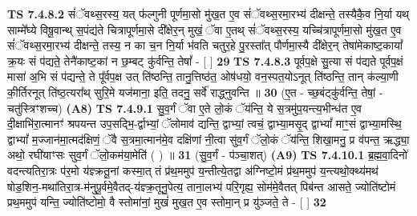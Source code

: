 \documentclass[17pt]{extarticle}
\begin{document}
                  \newline
                                \textbf{ TS 7.4.8.2} \newline
                  सं॑ॅवथ्स॒रस्य॒ यत् फ॑ल्गुनी पूर्णमा॒सो मु॑ख॒त ए॒व सं॑ॅवथ्स॒रमा॒रभ्य॑ दीक्षन्ते॒ तस्यैकै॒व नि॒र्या यथ् साम्मे᳚घ्ये विषू॒वान्थ् स॒पंद्य॑ते चित्रापूर्णमा॒से दी᳚क्षेर॒न् मुखं॒ ॅवा ए॒तथ् सं॑ॅवथ्स॒रस्य॒ यच्चि॑त्रापूर्णमा॒सो मु॑ख॒त ए॒व सं॑ॅवथ्स॒रमा॒रभ्य॑ दीक्षन्ते॒ तस्य॒ न का च॒न नि॒र्या भ॑वति चतुर॒हे पु॒रस्ता᳚त् पौर्णमा॒स्यै दी᳚क्षेर॒न् तेषा॑मेकाष्ट॒कायां᳚ क्र॒यः सं प॑द्यते॒ तेनै॑काष्ट॒कां न छ॒म्बट् कु॑र्वन्ति॒ तेषां᳚ - [  ] \textbf{  29} \newline
                  \newline
                                \textbf{ TS 7.4.8.3} \newline
                  पूर्वप॒क्षे सु॒त्या सं प॑द्यते पूर्वप॒क्षं मासा॑ अ॒भि सं प॑द्यन्ते॒ ते पू᳚र्वप॒क्ष उत् ति॑ष्ठन्ति॒ तानु॒त्तिष्ठ॑त॒ ओष॑धयो॒ वन॒स्पत॒योऽनूत् ति॑ष्ठन्ति॒ तान् क॑ल्या॒णी की॒र्तिरनूत् ति॑ष्ठ॒त्यरा᳚थ् सुरि॒मे यज॑माना॒ इति॒ तदनु॒ सर्वे॑ राद्ध्नुवन्ति ॥ \textbf{  30} \newline
                  \newline
                      (ए॒त - च्छ॒बंट्कु॑र्वन्ति॒ तेषां॒ - चतु॑स्त्रिꣳशच्च)  \textbf{(A8)} \newline \newline
                                        \textbf{ TS 7.4.9.1} \newline
                  सु॒व॒र्गं ॅवा ए॒ते लो॒कं ॅय॑न्ति॒ ये स॒त्रमु॑प॒यन्त्य॒भीन्ध॑त ए॒व दी॒क्षाभि॑रा॒त्मानꣳ॑ श्रपयन्त उप॒सद्भि॒-र्द्वाभ्यां॒ ॅलोमाव॑ द्यन्ति॒ द्वाभ्यां॒ त्वचं॒ द्वाभ्या॒मसृ॒द् द्वाभ्यां᳚ माꣳ॒॒सं द्वाभ्या॒मस्थि॒ द्वाभ्यां᳚ म॒ज्जान॑मा॒त्मद॑क्षिणं॒ ॅवै स॒त्रमा॒त्मान॑मे॒व दक्षि॑णां नी॒त्वा सु॑व॒र्गं ॅलो॒कं ॅय॑न्ति॒ शिखा॒मनु॒ प्र व॑पन्त॒ ऋद्ध्या॒ अथो॒ रघी॑याꣳसः सुव॒र्गं ॅलो॒कम॑या॒मेति॑ ( ) ॥ \textbf{  31 } \newline
                  \newline
                      (सु॒व॒र्गं - प॑ञ्चा॒शत्)  \textbf{(A9)} \newline \newline
                                        \textbf{ TS 7.4.10.1} \newline
                  ब्र॒ह्म॒वा॒दिनो॑ वदन्त्यतिरा॒त्रः प॑र॒मो य॑ज्ञ्क्रतू॒नां कस्मा॒त् तं प्र॑थ॒ममुप॑ य॒न्तीत्ये॒तद्वा अ॑ग्निष्टो॒मं प्र॑थ॒ममुप॑ य॒न्त्यथो॒क्थ्य॑मथ॑ षोड॒शिन॒-मथा॑तिरा॒त्र-म॑नुपू॒र्वमे॒वैतद्-य॑ज्ञ्क्र॒तूनु॒पेत्य॒ ताना॒लभ्य॑ परि॒गृह्य॒ सोम॑मे॒वैतत् पिब॑न्त आसते॒ ज्योति॑ष्टोमं प्रथ॒ममुप॑ यन्ति॒ ज्योति॑ष्टोमो॒ वै स्तोमा॑नां॒ मुखं॑ मुख॒त ए॒व स्तोमा॒न् प्र यु॑ञ्जते॒ ते - [  ] \textbf{  32} \newline
\end{document}
